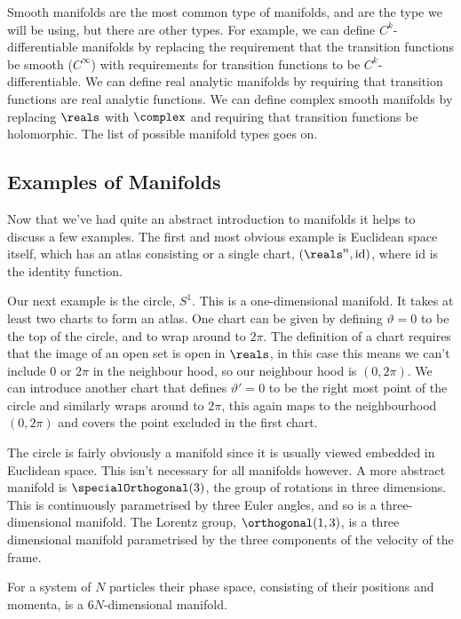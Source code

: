 \documentclass[fleqn]{NotesClass}
\begin{document}
    Smooth manifolds are the most common type of manifolds, and are the type we will be using, but there are other types.
    For example, we can define \(C^k\)-differentiable manifolds by replacing the requirement that the transition functions be smooth (\(C^{\infty}\)) with requirements for transition functions to be \(C^k\)-differentiable.
    We can define real analytic manifolds by requiring that transition functions are real analytic functions.
    We can define complex smooth manifolds by replacing \(\reals\) with \(\complex\) and requiring that transition functions be holomorphic.
    The list of possible manifold types goes on.
    
    \subsection{Examples of Manifolds}
    Now that we've had quite an abstract introduction to manifolds it helps to discuss a few examples.
    The first and most obvious example is Euclidean space itself, which has an atlas consisting or a single chart, \((\reals^n, \mathrm{id})\), where \(\mathrm{id}\) is the identity function.
    
    Our next example is the circle, \(S^1\).
    This is a one-dimensional manifold.
    It takes at least two charts to form an atlas.
    One chart can be given by defining \(\vartheta = 0\) to be the top of the circle, and to wrap around to \(2\pi\).
    The definition of a chart requires that the image of an open set is open in \(\reals\), in this case this means we can't include \(0\) or \(2\pi\) in the neighbour hood, so our neighbour hood is \((0, 2\pi)\).
    We can introduce another chart that defines \(\vartheta' = 0\) to be the right most point of the circle and similarly wraps around to \(2\pi\), this again maps to the neighbourhood \((0, 2\pi)\) and covers the point excluded in the first chart.
    
    The circle is fairly obviously a manifold since it is usually viewed embedded in Euclidean space.
    This isn't necessary for all manifolds however.
    A more abstract manifold is \(\specialOrthogonal(3)\), the group of rotations in three dimensions.
    This is continuously parametrised by three Euler angles, and so is a three-dimensional manifold.
    The Lorentz group, \(\orthogonal(1, 3)\), is a three dimensional manifold parametrised by the three components of the velocity of the frame.
    
    For a system of \(N\) particles their phase space, consisting of their positions and momenta, is a \(6N\)-dimensional manifold.
    
\end{document}
